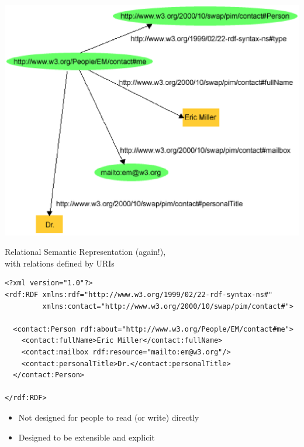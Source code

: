 \documentclass[a4paper,landscape,headrule,footrule,xetex]{foils}
\begin{document}
\includegraphics[height=0.8\textheight]{../pics/miller-rdf.eps}

Relational Semantic Representation (again!), 
\\ with relations defined by URIs


\begin{small}
\begin{verbatim}
<?xml version="1.0"?>
<rdf:RDF xmlns:rdf="http://www.w3.org/1999/02/22-rdf-syntax-ns#"
         xmlns:contact="http://www.w3.org/2000/10/swap/pim/contact#">

  <contact:Person rdf:about="http://www.w3.org/People/EM/contact#me">
    <contact:fullName>Eric Miller</contact:fullName>
    <contact:mailbox rdf:resource="mailto:em@w3.org"/>
    <contact:personalTitle>Dr.</contact:personalTitle> 
  </contact:Person>

</rdf:RDF>
\end{verbatim}
\end{small}
\begin{itemize}
\item Not designed for people to read (or write) directly
\item Designed to be extensible and explicit
\end{itemize}

\end{document}
